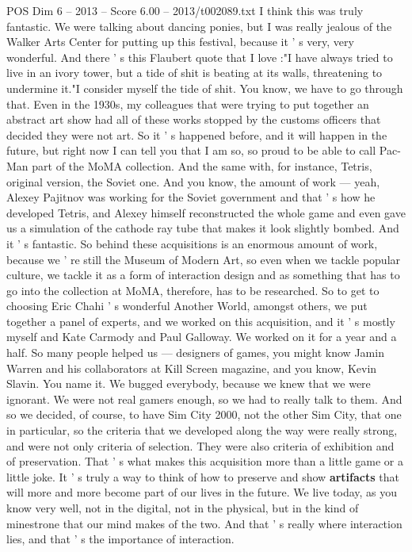 \begin{textsample}{POS Dim 6 – 2013 – Score 6.00 – 2013/t002089.txt}
I think this was truly fantastic.
We were talking about dancing ponies, but I was really jealous of the Walker Arts Center for putting up this festival, because it ' s very, very wonderful.
And there ' s this Flaubert quote that I love :"I have always tried to live in an ivory tower, but a tide of shit is beating at its walls, threatening to undermine it."I consider myself the tide of shit.
You know, we have to go through that.
Even in the 1930s, my colleagues that were trying to put together an abstract art show had all of these works stopped by the customs officers that decided they were not art.
So it ' s happened before, and it will happen in the future, but right now I can tell you that I am so, so proud to be able to call Pac-Man part of the MoMA collection.
And the same with, for instance, Tetris, original version, the Soviet one.
And you know, the amount of work — yeah, Alexey Pajitnov was working for the Soviet government and that ' s how he developed Tetris, and Alexey himself reconstructed the whole game and even gave us a simulation of the cathode ray tube that makes it look slightly bombed.
And it ' s fantastic.
So behind these acquisitions is an enormous amount of work, because we ' re still the Museum of Modern Art, so even when we tackle popular culture, we tackle it as a form of interaction design and as something that has to go into the collection at MoMA, therefore, has to be researched.
So to get to choosing Eric Chahi ' s wonderful Another World, amongst others, we put together a panel of experts, and we worked on this acquisition, and it ' s mostly myself and Kate Carmody and Paul Galloway.
We worked on it for a year and a half.
So many people helped us — designers of games, you might know Jamin Warren and his collaborators at Kill Screen magazine, and you know, Kevin Slavin.
You name it.
We bugged everybody, because we knew that we were ignorant.
We were not real gamers enough, so we had to really talk to them.
And so we decided, of course, to have Sim City 2000, not the other Sim City, that one in particular, so the criteria that we developed along the way were really strong, and were not only criteria of selection.
They were also criteria of exhibition and of preservation.
That ' s what makes this acquisition more than a little game or a little joke.
It ' s truly a way to think of how to preserve and show \textbf{artifacts} that will more and more become part of our lives in the future.
We live today, as you know very well, not in the digital, not in the physical, but in the kind of minestrone that our mind makes of the two.
And that ' s really where interaction lies, and that ' s the importance of interaction.

\end{textsample}
